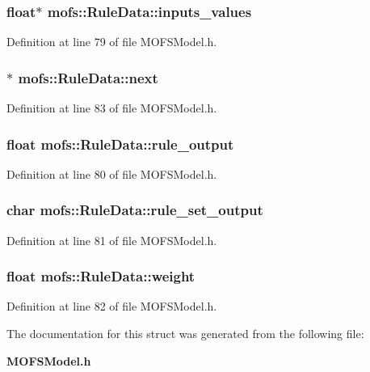 \subsubsection[{inputs\-\_\-values}]{\setlength{\rightskip}{0pt plus 5cm}float$\ast$ mofs\-::\-Rule\-Data\-::inputs\-\_\-values}\label{structmofs_1_1RuleData_ac84e95feb845959e2c67e613cfb6386a}


Definition at line 79 of file M\-O\-F\-S\-Model.\-h.

\subsubsection[{next}]{$\ast$ mofs\-::\-Rule\-Data\-::next}\label{structmofs_1_1RuleData_ac90780a87b2cb264a859a0d8d3410a21}


Definition at line 83 of file M\-O\-F\-S\-Model.\-h.

\subsubsection[{rule\-\_\-output}]{\setlength{\rightskip}{0pt plus 5cm}float mofs\-::\-Rule\-Data\-::rule\-\_\-output}\label{structmofs_1_1RuleData_a52d61ad2b2b8bbc483e3addffd31bce7}


Definition at line 80 of file M\-O\-F\-S\-Model.\-h.

\subsubsection[{rule\-\_\-set\-\_\-output}]{\setlength{\rightskip}{0pt plus 5cm}char mofs\-::\-Rule\-Data\-::rule\-\_\-set\-\_\-output}\label{structmofs_1_1RuleData_a993e07d60ebeee72868b5cf5f91452a5}


Definition at line 81 of file M\-O\-F\-S\-Model.\-h.

\subsubsection[{weight}]{\setlength{\rightskip}{0pt plus 5cm}float mofs\-::\-Rule\-Data\-::weight}\label{structmofs_1_1RuleData_a823777c544b3e6fffee00bcb80e8d827}


Definition at line 82 of file M\-O\-F\-S\-Model.\-h.



The documentation for this struct was generated from the following file\-:\begin{DoxyCompactItemize}
\item 
{\bf M\-O\-F\-S\-Model.\-h}\end{DoxyCompactItemize}
